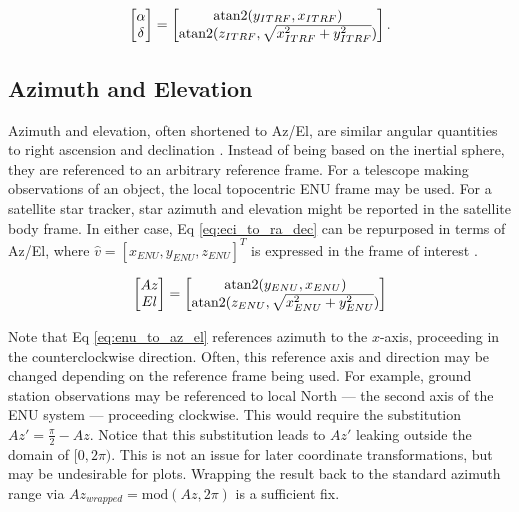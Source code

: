 \begin{equation} \label{eq:eci_to_ra_dec}
  \begin{bmatrix}
	\alpha \\
	\delta
  \end{bmatrix} = 
  \begin{bmatrix}
	\operatorname{atan2}(y_{ITRF}, x_{ITRF}) \\
	\operatorname{atan2}(z_{ITRF}, \sqrt{x_{ITRF}^2 + y_{ITRF}^2})
  \end{bmatrix}.
\end{equation}

\subsection{Azimuth and Elevation}

Azimuth and elevation, often shortened to Az/El, are similar angular quantities to right ascension and declination \cite{frueh2019notes}. Instead of being based on
the inertial sphere, they are referenced to an arbitrary reference frame. For a telescope making
observations of an object, the local topocentric ENU frame may be used. For a satellite star
tracker, star azimuth and elevation might be reported in the satellite body frame. In either case,
Eq \ref{eq:eci_to_ra_dec} can be repurposed in terms of Az/El, where $\hat{v} = \left[ x_{ENU}, y_{ENU}, z_{ENU}
\right]^T$ is expressed in the frame of interest \cite{frueh2019notes}.

\begin{equation} \label{eq:enu_to_az_el}
  \begin{bmatrix}
	Az \\
	El
  \end{bmatrix} = 
  \begin{bmatrix}
	\operatorname{atan2}(y_{ENU}, x_{ENU}) \\
	\operatorname{atan2}(z_{ENU}, \sqrt{x_{ENU}^2 + y_{ENU}^2})
  \end{bmatrix}
\end{equation}

Note that Eq \ref{eq:enu_to_az_el} references azimuth to the $x$-axis, proceeding in the
counterclockwise direction. Often, this reference axis and direction may be changed depending on the
reference frame being used. For example, ground station observations may be referenced to local
North ---  the second axis of the ENU system ---  proceeding clockwise. This would require the
substitution $Az' = \frac{\pi}{2} - Az$. Notice that this substitution leads to $Az'$ leaking
outside the domain of $[0, 2\pi)$. This is not an issue for later coordinate transformations, but
may be undesirable for plots. Wrapping the result back to the standard azimuth range via
$Az_{wrapped} = \textrm{mod}(Az, 2\pi)$ is a sufficient fix.

